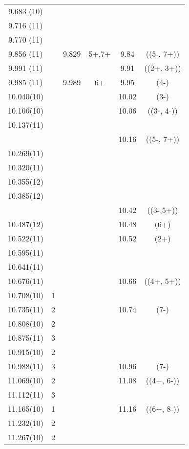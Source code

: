 \begin{center}
\begin{longtable}{cc cc cc}
  9.683 (10)    &   &   &   &   &   \\
  9.716 (11)    &   &   &   &   &   \\
  9.770 (11)    &   &   &   &   &   \\
  9.856 (11)    &   & 9.829 & 5+,7+ & 9.84  & ((5-, 7+))  \\
  9.991 (11)    &   &   &   & 9.91  & ((2+. 3+))  \\
  9.985 (11)    &   & 9.989 & 6+  & 9.95  & (4-)  \\
  10.040(10)    &   &   &   & 10.02 & (3-)  \\
  10.100(10)    &   &   &   & 10.06 & ((3-, 4-))  \\
  10.137(11)    &   &   &   &   &   \\
  &   &   &   & 10.16 & ((5-, 7+))  \\
  10.269(11)    &   &   &   &   &   \\
  10.320(11)    &   &   &   &   &   \\
  10.355(12)    &   &   &   &   &   \\
  10.385(12)    &   &   &   &   &   \\
  &   &   &   & 10.42 & ((3-,5+)) \\
  10.487(12)    &   &   &   & 10.48 & (6+)  \\
  10.522(11)    &   &   &   & 10.52 & (2+)  \\
  10.595(11)    &   &   &   &   &   \\
     10.641(11)   &   &   &   &   &   \\
     10.676(11)   &   &   &   & 10.66 & ((4+, 5+))  \\
     10.708(10)   & 1 &   &   &   &   \\
     10.735(11)   & 2 &   &   & 10.74 & (7-)  \\
     10.808(10)   & 2 &   &   &   &   \\
     10.875(11)   & 3 &   &   &   &   \\
     10.915(10)   & 2 &   &   &   &   \\
   10.988(11)     & 3 &   &   & 10.96 & (7-)  \\
    11.069(10)    & 2 &   &   & 11.08 & ((4+, 6-))  \\
     11.112(11)   & 3 &   &   &   &   \\
    11.165(10)    & 1 &   &   & 11.16 & ((6+, 8-))  \\
    11.232(10)    & 2 &   &   &   &   \\
    11.267(10)    & 2 &   &   &   &   \\

\end{longtable}
\end{center}
